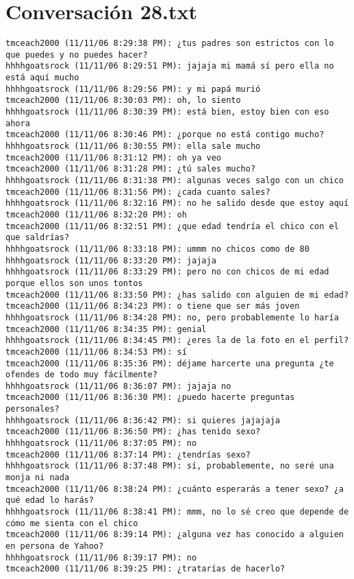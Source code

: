 \section{Conversaci\'on 28.txt}

\begin{verbatim}
tmceach2000 (11/11/06 8:29:38 PM): ¿tus padres son estrictos con lo que puedes y no puedes hacer?
hhhhgoatsrock (11/11/06 8:29:51 PM): jajaja mi mamá sí pero ella no está aquí mucho
hhhhgoatsrock (11/11/06 8:29:56 PM): y mi papá murió
tmceach2000 (11/11/06 8:30:03 PM): oh, lo siento
hhhhgoatsrock (11/11/06 8:30:39 PM): está bien, estoy bien con eso ahora
tmceach2000 (11/11/06 8:30:46 PM): ¿porque no está contigo mucho?
hhhhgoatsrock (11/11/06 8:30:55 PM): ella sale mucho
tmceach2000 (11/11/06 8:31:12 PM): oh ya veo
tmceach2000 (11/11/06 8:31:28 PM): ¿tú sales mucho?
hhhhgoatsrock (11/11/06 8:31:38 PM): algunas veces salgo con un chico
tmceach2000 (11/11/06 8:31:56 PM): ¿cada cuanto sales?
hhhhgoatsrock (11/11/06 8:32:16 PM): no he salido desde que estoy aquí
tmceach2000 (11/11/06 8:32:20 PM): oh
tmceach2000 (11/11/06 8:32:51 PM): ¿que edad tendría el chico con el que saldrías?
hhhhgoatsrock (11/11/06 8:33:18 PM): ummm no chicos como de 80
hhhhgoatsrock (11/11/06 8:33:20 PM): jajaja
hhhhgoatsrock (11/11/06 8:33:29 PM): pero no con chicos de mi edad porque ellos son unos tontos
tmceach2000 (11/11/06 8:33:50 PM): ¿has salido con alguien de mi edad?
tmceach2000 (11/11/06 8:34:23 PM): o tiene que ser más joven
hhhhgoatsrock (11/11/06 8:34:28 PM): no, pero probablemente lo haría
tmceach2000 (11/11/06 8:34:35 PM): genial
hhhhgoatsrock (11/11/06 8:34:45 PM): ¿eres la de la foto en el perfil?
tmceach2000 (11/11/06 8:34:53 PM): sí
tmceach2000 (11/11/06 8:35:36 PM): déjame harcerte una pregunta ¿te ofendes de todo muy fácilmente?
hhhhgoatsrock (11/11/06 8:36:07 PM): jajaja no
tmceach2000 (11/11/06 8:36:30 PM): ¿puedo hacerte preguntas personales?
hhhhgoatsrock (11/11/06 8:36:42 PM): si quieres jajajaja
tmceach2000 (11/11/06 8:36:50 PM): ¿has tenido sexo?
hhhhgoatsrock (11/11/06 8:37:05 PM): no
tmceach2000 (11/11/06 8:37:14 PM): ¿tendrías sexo?
hhhhgoatsrock (11/11/06 8:37:48 PM): sí, probablemente, no seré una monja ni nada
tmceach2000 (11/11/06 8:38:24 PM): ¿cuánto esperarás a tener sexo? ¿a qué edad lo harás?
hhhhgoatsrock (11/11/06 8:38:41 PM): mmm, no lo sé creo que depende de cómo me sienta con el chico
tmceach2000 (11/11/06 8:39:14 PM): ¿alguna vez has conocido a alguien en persona de Yahoo?
hhhhgoatsrock (11/11/06 8:39:17 PM): no
tmceach2000 (11/11/06 8:39:25 PM): ¿tratarías de hacerlo?

\end{verbatim}
